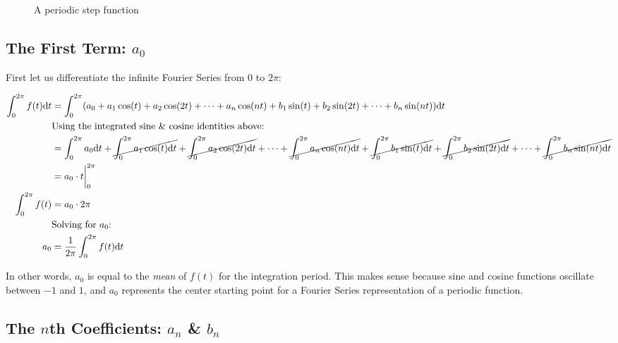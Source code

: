 \documentclass[10pt]{article} %
\begin{document}
\begin{figure}[h!]
    \caption{A periodic step function} %
    \label{fig:periodic_step_function} %
\end{figure}

\subsection*{The First Term: $a_0$}

First let us differentiate the infinite Fourier Series from $0$ to $2\pi$:

\begin{align}
    \int_0^{2\pi} f(t) \mathrm{d}t & = \int_0^{2\pi} (a_0 + a_1\cos(t) + a_2\cos(2t) + \dots + a_n\cos(nt) + b_1\sin(t) + b_2\sin(2t) + \dots + b_n\sin(nt))\mathrm{d}t\\
    &\text{Using the integrated sine \& cosine identities above:}\\
    & = \int_0^{2\pi} a_0 \mathrm{d}t + \cancel{\int_0^{2\pi} a_1\cos(t) \mathrm{d}t} + \cancel{\int_0^{2\pi} a_2\cos(2t) \mathrm{d}t} + \dots + \cancel{\int_0^{2\pi} a_n\cos(nt) \mathrm{d}t} + \cancel{\int_0^{2\pi} b_1\sin(t) \mathrm{d}t} + \cancel{\int_0^{2\pi} b_2\sin(2t) \mathrm{d}t} + \dots + \cancel{\int_0^{2\pi} b_n\sin(nt) \mathrm{d}t} \\
    & = a_0 \cdot t \bigg\vert_0^{2\pi} \\
    \int_0^{2\pi} f(t) & = a_0 \cdot 2\pi \\
    & \text{Solving for $a_0$:}\\
    a_0 & = \frac{1}{2\pi}\int_0^{2\pi} f(t) \mathrm{d}t
\end{align} 

In other words, $a_0$ is equal to the \textit{mean} of $f(t)$ for the integration period. This makes sense because sine and cosine functions oscillate between $-1$ and $1$, and $a_0$ represents the center starting point for a Fourier Series representation of a periodic function.

\subsection*{The $n$th Coefficients: $a_n$ \& $b_n$}
\end{document}

